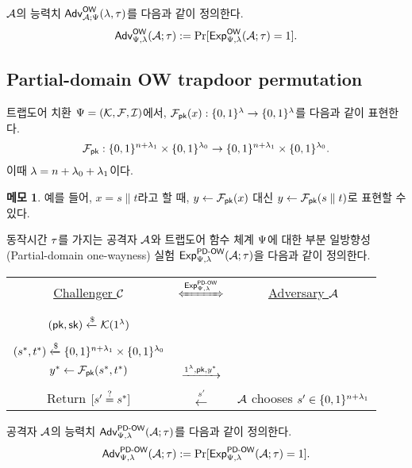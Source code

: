 \documentclass{article}
\theoremstyle{definition}
\newtheorem{memo}{메모}
\begin{document}
$\mathcal{A}$의 능력치 $\textsf{Adv}^{\textsf{OW}}_{\mathcal{A};
\Psi}(\lambda, \tau)$를 다음과 같이 정의한다.
$$
	\textsf{Adv}^{\textsf{OW}}_{\Psi, \lambda}(\mathcal{A}; \tau) := \Pr[\textsf{Exp}^{\textsf{OW}}_{\Psi, \lambda}(\mathcal{A}; \tau) = 1].
$$

\subsection{Partial-domain OW trapdoor permutation}

트랩도어 치환 $\Psi = (\mathcal{K}, \mathcal{F}, \mathcal{I})$에서, $\mathcal{F}_{\textsf{pk}}(x):\{0, 1\}^{\lambda} \to
\{0, 1\}^{\lambda}$를 다음과 같이 표현한다.
$$
	\mathcal{F}_{\textsf{pk}}: \{0, 1\}^{n + \lambda_1} \times \{0, 1\}^{\lambda_0} \to \{0, 1\}^{n + \lambda_1} \times \{0, 1\}^{\lambda_0}.
$$
이때 $\lambda = n + \lambda_0 + \lambda_1$이다. 
\begin{memo}
	예를 들어, $x = s \parallel t$라고 할 때, $y \gets \mathcal{F}_{\textsf{pk}}(x)$ 대신 $y
	\gets \mathcal{F}_{\textsf{pk}}(s \parallel t)$로 표현할 수 있다.
\end{memo}
동작시간 $\tau$를 가지는 공격자 $\mathcal{A}$와 트랩도어 함수 체계 $\Psi$에 대한 부분
일방향성(Partial-domain one-wayness) 실험 $\textsf{Exp}^{\textsf{PD-OW}}_{\Psi, \lambda}(\mathcal{A};
\tau)$을 다음과 같이 정의한다.

\begin{tcolorbox}[colback=white]
	\centering
	\begin{tabularx}{\linewidth}{CcC}
		\underline{Challenger $\mathcal{C}$} & $\xLeftrightarrow{\Exp^{\owpd}_{\tdsch, \sp}}$ & \underline{Adversary $\mathcal{A}$} \\
		\\
		$(\textsf{pk}, \textsf{sk}) \xleftarrow{\$} \mathcal{K}(1^{\lambda})$ & & \\
		\\
		$(s^*, t^*) \xleftarrow{\$} \{0, 1\}^{n + \lambda_1} \times \{0, 1\}^{\lambda_0}$ \\ $y^* \gets \mathcal{F}_{\textsf{pk}}(s^*, t^*)$ & $\xrightarrow{1^{\lambda}, \textsf{pk}, y^*}$ & \\
		\\
		Return $[s' \overset{?}{=} s^*]$ & $\xleftarrow{s'}$ & $\mathcal{A}$ chooses $s' \in \{0, 1\}^{n + \lambda_1}$ \\
  \end{tabularx}
\end{tcolorbox}

공격자 $\mathcal{A}$의 능력치 $\textsf{Adv}^{\textsf{PD-OW}}_{\Psi, \lambda}(\mathcal{A}; \tau)$를 다음과 같이 정의한다.
$$
	\textsf{Adv}^{\textsf{PD-OW}}_{\Psi, \lambda}(\mathcal{A}; \tau) := \Pr[\textsf{Exp}^{\textsf{PD-OW}}_{\Psi, \lambda}(\mathcal{A}; \tau) = 1].
$$
\end{document}
